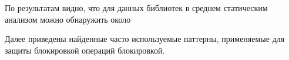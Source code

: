 По результатам видно, что для данных библиотек  в среднем статическим анализом можно обнаружить около

Далее приведены найденные часто используемые паттерны, применяемые для защиты блокировкой операций блокировкой.
\\
\\
\\
\\




\FloatBarrier
